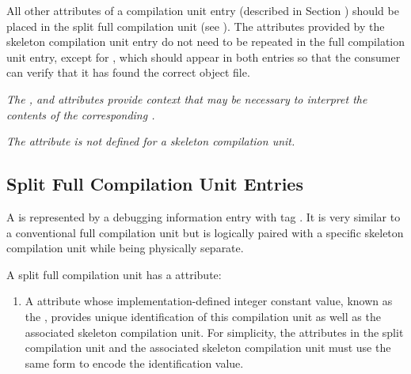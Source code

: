 All other attributes of a compilation unit entry (described
in Section ) 
should be placed in the split full compilation unit
(see ).
The attributes provided by the skeleton compilation
unit entry do not need to be repeated in the full compilation
unit entry, except for \DWATdwoid, which should appear in
both entries so that the consumer can verify that it has
found the correct object file.

\textit{The \DWATaddrbase{}, \DWATrangesbase{} and 
\DWATstroffsetsbase{} attributes provide context that may be 
necessary to interpret the contents
of the corresponding \splitDWARFobjectfile.}

\textit{The \DWATbasetypes{} attribute is not defined for a
skeleton compilation unit.}


\subsection{Split Full Compilation Unit Entries}
\label{chap:splitfullcompilationunitentries}
A  is represented by a 
debugging information entry with tag \DWTAGcompileunit.
It is very similar to a conventional full compilation unit but
is logically paired with a specific skeleton compilation unit while
being physically separate.

A split full compilation unit has a \DWATdwoid{} attribute:
\begin{enumerate}[1. ]
\item
A \DWATdwoidDEFN{} attribute
whose implementation-defined integer constant value,
known as the \CUsignature,
provides unique identification of this compilation unit
as well as the associated skeleton compilation unit.
For simplicity, the \DWATdwoidNAME{} attributes in the 
split compilation unit and the associated skeleton 
compilation unit must use the same form to encode the 
identification value.

\end{enumerate}

